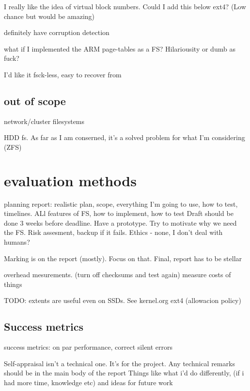 \documentclass[a4paper]{report}
\begin{document}
        I really like the idea of virtual block numbers. Could I add this below
        ext4? (Low chance but would be amazing)

        definitely have corruption detection

        what if I implemented the ARM page-tables as a FS? Hilariousity or dumb as fuck?

        I'd like it fsck-less, easy to recover from

        \subsection{out of scope}

            network/cluster filesystems

            HDD fs. As far as I am conserned, it's a solved problem for what
            I'm considering (ZFS)


    \section{evaluation methods}

    planning report: realistic plan, scope, everything I'm going to use, how to test, timelines. ALl features of FS, how to implement, how to test
    Draft should be done 3 weeks before deadline. Have a prototype. Try to motivate why we need the FS. Risk assesment, backup if it fails. Ethics - none, I don't deal with humans?

    Marking is on the report (mostly). Focus on that. Final, report has to be stellar

    overhead mesurements. (turn off checksums and test again) measure costs of things

    TODO: extents are useful even on SSDs. See kernel.org ext4 (allowacion policy)

        \subsection{Success metrics}
            success metrics: on par performance, correct silent errors

        Self-appraisal isn't a technical one. It's for the project. Any technical remarks should be in the main body of the report
        Things like what i'd do differently, (if i had more time, knowledge etc) and ideas for future work
\end{document}

